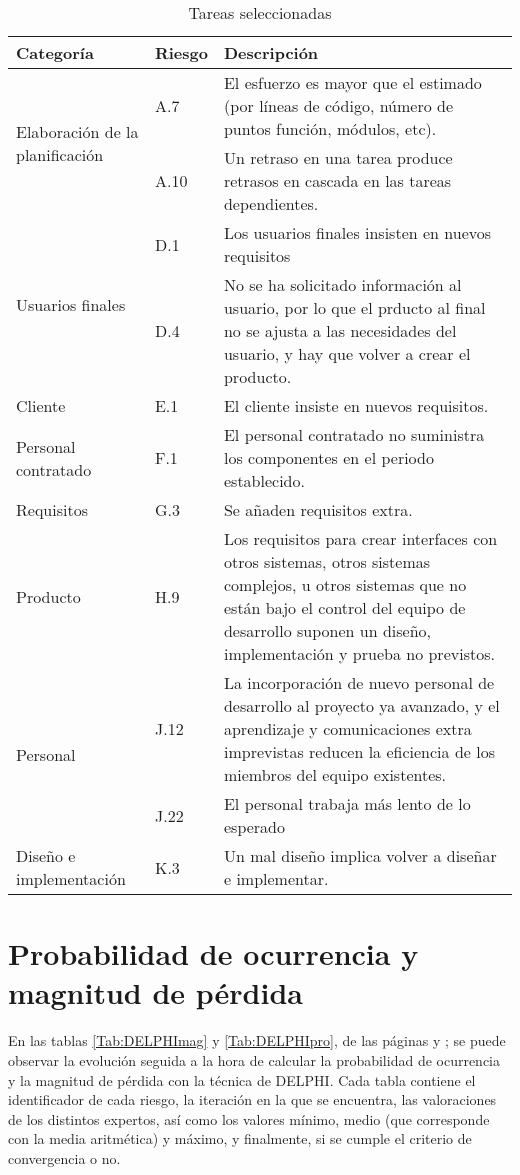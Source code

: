 \documentclass[11pt,a4paper,spanish,twoside]{report}
\begin{document}
\begin{table}[!ht]
  \centering
  \begin{tabular}{|p{3.5cm}||p{1.1cm}|p{6.3cm}|}
    \hline
    \textbf{Categoría} & \textbf{Riesgo} & \textbf{Descripción} \\
    \hline\hline
    \multirow{2}{3.5cm}{Elaboración de la planificación}
    & A.7 & El esfuerzo es mayor que el estimado (por líneas de código,
    número de puntos función, módulos, etc). \\  
    \cline{2-3}
    & A.10 & Un retraso en una tarea produce retrasos en cascada en las
    tareas dependientes. \\
    \hline
    \multirow{2}{3cm}{Usuarios finales}
    & D.1 & Los usuarios finales insisten en nuevos requisitos\\
    \cline{2-3}
    & D.4 & No se ha solicitado información al usuario, por lo que el prducto
    al final  no se ajusta a las necesidades del usuario, y hay que volver a
    crear el producto.\\
    \hline
    Cliente& E.1 & El cliente insiste en nuevos requisitos.\\
    \hline
    Personal contratado & F.1 & El personal contratado no suministra los
    componentes en el periodo establecido.\\
    \hline
    Requisitos& G.3 & Se añaden requisitos extra.\\
    \hline
    Producto & H.9 &  Los requisitos para crear interfaces con otros
    sistemas, otros sistemas complejos, u otros sistemas que no están bajo el
    control del equipo de desarrollo suponen un diseño, implementación y
    prueba no previstos.\\ 
    \hline
    \multirow{2}{3.5cm}{Personal}
    & J.12 & La incorporación de nuevo personal de desarrollo al proyecto ya
    avanzado, y el aprendizaje y comunicaciones extra imprevistas reducen la
    eficiencia de los miembros del equipo existentes.\\ 
    \cline{2-3}
    & J.22 & El personal trabaja más lento de lo esperado\\
    \hline
    \multirow{1}{3.5cm}{Diseño e implementación}
    & K.3 & Un mal diseño implica volver a diseñar e implementar.\\
   \hline
  \end{tabular}
  \caption{Tareas seleccionadas}
  \label{Tab:tar_sel}
\end{table}

\chapter{Probabilidad de ocurrencia y magnitud de pérdida} 
En las tablas \ref{Tab:DELPHImag} y \ref{Tab:DELPHIpro}, de las páginas
\pageref{Tab:DELPHImag} y \pageref{Tab:DELPHIpro}; se  
puede observar la evolución seguida a la hora de calcular la probabilidad de
ocurrencia y la magnitud de pérdida con la técnica de DELPHI. Cada tabla
contiene el identificador de cada riesgo, la iteración en 
la que se encuentra, las valoraciones de los distintos expertos, así como los
valores mínimo, medio (que
corresponde con la media aritmética) y máximo, y finalmente, si se cumple el
criterio de convergencia o no. 
\end{document}
